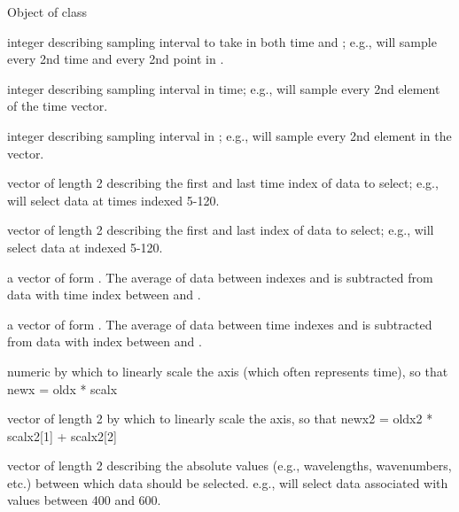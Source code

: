 \documentclass{article}
\begin{document}
\begin{Arguments}
\begin{ldescription}
\item[\code{data}] Object of class 
\item[\code{sample}] integer describing sampling interval to take in both time and 
; e.g.,  
will sample every 2nd time and every 2nd point in 
.
\item[\code{sample\_time}] integer describing sampling interval in time; e.g.,
 will sample every 2nd element of the time vector. 
\item[\code{sample\_lambda}] integer describing sampling interval in ; 
e.g.,  will sample every 2nd element in the 
 vector. 
\item[\code{sel\_time}] vector of length 2 describing the first and last time 
index of data to select; e.g.,  will select 
data at times indexed 5-120. 
\item[\code{sel\_lambda}] vector of length 2 describing the first and last   
index of data to select; e.g.,  
will select data at 
indexed 5-120. 
\item[\code{baselinetime}] a vector of form .  The average of data between 
 indexes  
 and  
is subtracted from data with 
time index between  and .  
\item[\code{baselinelambda}] a vector of form .  The average of data between time indexes  
 and  
is subtracted from data with  index 
between  and .
\item[\code{scalx}] numeric by which to linearly scale the  axis
(which often represents time), so that newx = oldx * scalx 
\item[\code{scalx2}] vector of length 2 by which to linearly scale the 
 axis, so that newx2 = oldx2 * scalx2[1] + scalx2[2]
\item[\code{sel\_lambda\_ab}] vector of length 2 describing the absolute values
(e.g., wavelengths, wavenumbers, etc.) between which data should be
selected.   e.g.,  will select data  
associated with  values between 400 and 600. 

\end{ldescription}
\end{Arguments}
\end{document}
